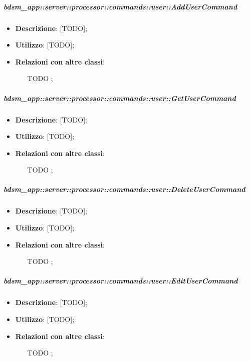         \subparagraph{bdsm\_app::server::processor::commands::user::AddUserCommand} %
        \label{subp:bdsm_app_server_processor_commands_user_addusercommand}
        \begin{itemize}
          \item \textbf{Descrizione}: [TODO];
          \item \textbf{Utilizzo}: [TODO];
          \item \textbf{Relazioni con altre classi}:
            \begin{itemize}
              \item [TODO];
            \end{itemize}
        \end{itemize}

        \subparagraph{bdsm\_app::server::processor::commands::user::GetUserCommand} %
        \label{subp:bdsm_app_server_processor_commands_user_getusercommand}
        \begin{itemize}
          \item \textbf{Descrizione}: [TODO];
          \item \textbf{Utilizzo}: [TODO];
          \item \textbf{Relazioni con altre classi}:
            \begin{itemize}
              \item [TODO];
            \end{itemize}
        \end{itemize}

        \subparagraph{bdsm\_app::server::processor::commands::user::DeleteUserCommand} %
        \label{subp:bdsm_app_server_processor_commands_user_deleteusercommand}
        \begin{itemize}
          \item \textbf{Descrizione}: [TODO];
          \item \textbf{Utilizzo}: [TODO];
          \item \textbf{Relazioni con altre classi}:
            \begin{itemize}
              \item [TODO];
            \end{itemize}
        \end{itemize}

        \subparagraph{bdsm\_app::server::processor::commands::user::EditUserCommand} %
        \label{subp:bdsm_app_server_processor_commands_user_editusercommand}
        \begin{itemize}
          \item \textbf{Descrizione}: [TODO];
          \item \textbf{Utilizzo}: [TODO];
          \item \textbf{Relazioni con altre classi}:
            \begin{itemize}
              \item [TODO];
            \end{itemize}
        \end{itemize}

